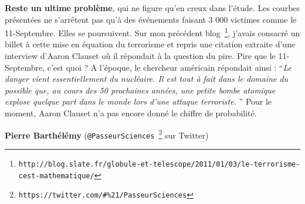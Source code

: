 \documentclass[11pt,twoside,a4paper]{article}
\begin{document}
\begin{multicols}{2}
	\textbf{Reste un ultime probl{\`e}me}, qui ne figure qu'en creux dans l'{\'e}tude. Les courbes pr{\'e}sent{\'e}es ne s'arr{\^e}tent pas qu'{\`a} des {\'e}v{\'e}nements faisant 3 000 victimes comme le 11-Septembre. Elles se poursuivent. Sur mon pr{\'e}c{\'e}dent blog~\footnote{\texttt{http://blog.slate.fr/globule-et-telescope/2011/01/03/le-terrorisme-cest-mathematique/}}, j'avais consacr{\'e} un billet {\`a} cette mise en {\'e}quation du terrorisme et repris une citation extraite d'une interview d'Aaron Clauset o{\`u} il r{\'e}pondait {\`a} la question du pire. Pire que le 11-Septembre, c'est quoi ? A l'{\'e}poque, le chercheur am{\'e}ricain r{\'e}pondait ainsi : ``\emph{Le danger vient essentiellement du nucl{\'e}aire. Il est tout {\`a} fait dans le domaine du possible que, au cours des 50 prochaines ann{\'e}es, une petite bombe atomique explose quelque part dans le monde lors d'une attaque terroriste. }'' Pour le moment, Aaron Clauset n'a pas encore donn{\'e} le chiffre de probabilit{\'e}. %
	
	\begin{flushright}
		\textbf{Pierre Barth{\'e}l{\'e}my} (\texttt{@PasseurSciences~\footnote{\texttt{https://twitter.com/\#\%21/PasseurSciences}}} sur Twitter)
	\end{flushright}
\end{multicols}
\end{document}
